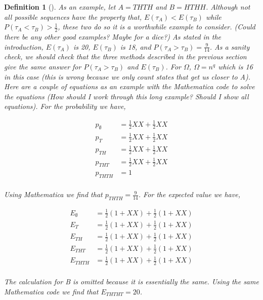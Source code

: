 \documentclass{article}
\newtheorem{definition}[theorem]{Definition}
\numberwithin{mytheorem}{subsection} %
\begin{document}
\begin{definition}[\cite{}]
		As an example, let $A = THTH$ and $B = HTHH$. Although not all possible sequences have the property that, $E(\tau_A) < E(\tau_B)$ while $P(\tau_A < \tau_B) > \frac{1}{2}$, these two do so it is a worthwhile example to consider. (Could there be any other good examples? Maybe for a dice?) As stated in the introduction, $E(\tau_A)$ is 20, $E(\tau_B)$ is 18, and $P(\tau_A > \tau_B) = \frac{9}{14}$. As a sanity check, we should check that the three methods described in the previous section give the same answer for $P(\tau_A > \tau_B)$ and $E(\tau_B)$. For $\Omega$, $\Omega = n^q$ which is 16 in this case (this is wrong because we only count states that get us closer to A). Here are a couple of equations as an example with the Mathematica code to solve the equations (How should I work through this long example? Should I show all equations). For the probability we have,

		\begin{equation} 	
		\begin{split}
		p_{\emptyset} & = \frac{1}{2} XX + \frac{1}{2} XX \\
		p_{T} & = \frac{1}{2} XX + \frac{1}{2} XX \\
		p_{TH} & = \frac{1}{2} XX + \frac{1}{2} XX \\
		p_{THT} & = \frac{1}{2} XX + \frac{1}{2} XX \\
		p_{THTH} & = 1 \\
		\end{split}
		\end{equation}


		Using Mathematica we find that $p_{THTH} = \frac{9}{14}$. For the expected value we have,

		\begin{equation} 	
		\begin{split}
		E_{\emptyset} & = \frac{1}{2} (1 + XX) + \frac{1}{2} (1 + XX) \\
		E_{T} & = \frac{1}{2} (1 + XX) + \frac{1}{2} (1 + XX) \\
		E_{TH} & = \frac{1}{2} (1 + XX) + \frac{1}{2} (1 + XX) \\
		E_{THT} & = \frac{1}{2} (1 + XX) + \frac{1}{2} (1 + XX) \\
		E_{THTH} & = \frac{1}{2} (1 + XX) + \frac{1}{2} (1 + XX) \\
		\end{split}
		\end{equation}

		The calculation for B is omitted because it is essentially the same. Using the same Mathematica code we find that $E_{THTHT} = 20$.



\end{definition}
\end{document}
